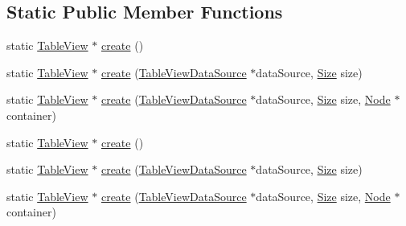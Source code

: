 \subsection*{Static Public Member Functions}
\begin{DoxyCompactItemize}
\item 
static \hyperlink{classTableView}{Table\+View} $\ast$ \hyperlink{classTableView_a298f6ec9b9dc31b643b2027e3c91d6a1}{create} ()
\item 
static \hyperlink{classTableView}{Table\+View} $\ast$ \hyperlink{classTableView_af7ff725904118f7caa7fcc447819a6e1}{create} (\hyperlink{classTableViewDataSource}{Table\+View\+Data\+Source} $\ast$data\+Source, \hyperlink{classSize}{Size} size)
\item 
static \hyperlink{classTableView}{Table\+View} $\ast$ \hyperlink{classTableView_aec43e89bafbdb358c0de3e05e92b1006}{create} (\hyperlink{classTableViewDataSource}{Table\+View\+Data\+Source} $\ast$data\+Source, \hyperlink{classSize}{Size} size, \hyperlink{classNode}{Node} $\ast$container)
\item 
static \hyperlink{classTableView}{Table\+View} $\ast$ \hyperlink{classTableView_af5e1b12f61e42fc05c1e798bd9603af6}{create} ()
\item 
static \hyperlink{classTableView}{Table\+View} $\ast$ \hyperlink{classTableView_add92e8beb89ba7e76848ec1c07836a1c}{create} (\hyperlink{classTableViewDataSource}{Table\+View\+Data\+Source} $\ast$data\+Source, \hyperlink{classSize}{Size} size)
\item 
static \hyperlink{classTableView}{Table\+View} $\ast$ \hyperlink{classTableView_a70a35ba0d9947307b762ee96e71dfa76}{create} (\hyperlink{classTableViewDataSource}{Table\+View\+Data\+Source} $\ast$data\+Source, \hyperlink{classSize}{Size} size, \hyperlink{classNode}{Node} $\ast$container)
\end{DoxyCompactItemize}
